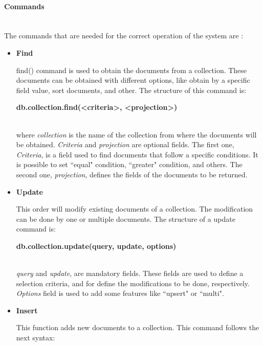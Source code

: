 \documentclass[12pt, a4paper,twoside]{tesi_upf}
\begin{document}
            \paragraph{Commands}\\
            The commands that are needed for the correct operation of the system are \cite{mongocmd}:
            \begin{itemize}
            \item \textbf{Find}
            
            find() command is used to obtain the documents from a collection. These documents can be obtained with different options, like obtain by a specific field value, sort documents, and other.
            The structure of this command is: \\
            
            \centerline{\textbf{db.collection.find(\textless criteria\textgreater, \textless projection\textgreater)}}\\
            
            where \textit{collection} is the name of the collection from where the documents will be obtained. \textit{Criteria} and \textit{projection} are optional fields. The first one, \textit{Criteria}, is a field used to find documents that follow a specific conditions. It is possible to set ``equal" condition, ``greater" condition, and others. The second one, \textit{projection}, defines the fields of the documents to be returned.
            
            \item \textbf{Update}
            
            This order will modify existing documents of a collection. The modification can be done by one or multiple documents. The structure of a update command is: \\
            
            \centerline{\textbf{db.collection.update(query, update, options)}}\\
            \textit{query} and \textit{update}, are mandatory fields. These fields are used to define a selection criteria, and for define the modifications to be done, respectively. \textit{Options} field is used to add some features like ``upsert" or ``multi".
            
            \item \textbf{Insert}
            
            This function adds new documents to a collection. This command follows the next syntax: \\
                

\end{itemize}
\end{document}
